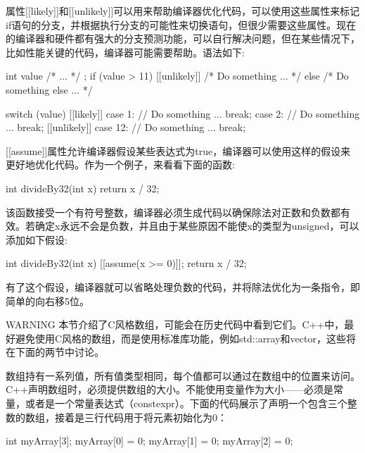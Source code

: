 属性[[likely]]和[[unlikely]]可以用来帮助编译器优化代码，可以使用这些属性来标记if语句的分支，并根据执行分支的可能性来切换语句，但很少需要这些属性。现在的编译器和硬件都有强大的分支预测功能，可以自行解决问题，但在某些情况下，比如性能关键的代码，编译器可能需要帮助。语法如下:

\begin{cpp}
int value { /* ... */ };
if (value > 11) [[unlikely]] { /* Do something ... */ }
else { /* Do something else ... */ }

switch (value)
{
    [[likely]] case 1:
        // Do something ...
        break;
    case 2:
        // Do something ...
        break;
    [[unlikely]] case 12:
        // Do something ...
        break;
}
\end{cpp}


\mySamllsection{[[assume]]}

[[assume]]属性允许编译器假设某些表达式为true，编译器可以使用这样的假设来更好地优化代码。作为一个例子，来看看下面的函数:

\begin{cpp}
int divideBy32(int x)
{
    return x / 32;
}
\end{cpp}

该函数接受一个有符号整数，编译器必须生成代码以确保除法对正数和负数都有效。若确定x永远不会是负数，并且由于某些原因不能使x的类型为unsigned，可以添加如下假设:

\begin{cpp}
int divideBy32(int x)
{
    [[assume(x >= 0)]];
    return x / 32;
}
\end{cpp}

有了这个假设，编译器就可以省略处理负数的代码，并将除法优化为一条指令，即简单的向右移5位。


\begin{myWarning}{WARNING}
本节介绍了C风格数组，可能会在历史代码中看到它们。C++中，最好避免使用C风格的数组，而是使用标准库功能，例如std::array和vector，这些将在下面的两节中讨论。
\end{myWarning}

数组持有一系列值，所有值类型相同，每个值都可以通过在数组中的位置来访问。C++声明数组时，必须提供数组的大小。不能使用变量作为大小——必须是常量，或者是一个常量表达式（constexpr）。下面的代码展示了声明一个包含三个整数的数组，接着是三行代码用于将元素初始化为0：

\begin{cpp}
int myArray[3];
myArray[0] = 0;
myArray[1] = 0;
myArray[2] = 0;
\end{cpp}

